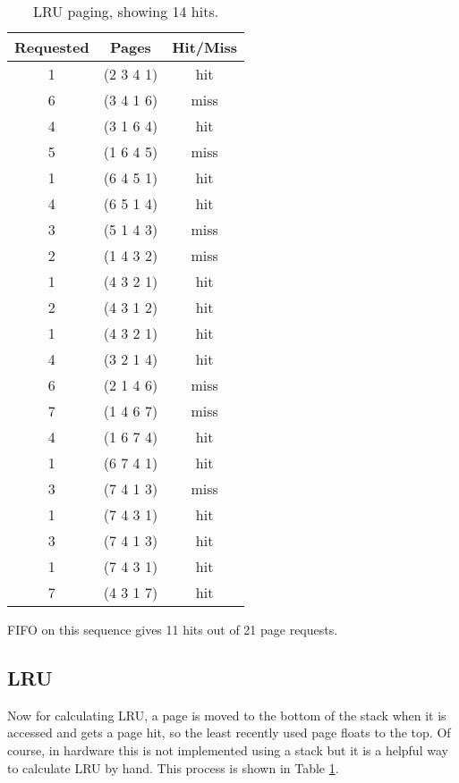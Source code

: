 \documentclass[12pt,letterpaper]{article}
\begin{document}
\begin{table}[!htb]
\begin{subtable}{.5\linewidth}
    \end{subtable}%
    \begin{subtable}{.5\linewidth}
      \centering
        \begin{tabular}{c|c|c}
        Requested & Pages & Hit/Miss\\
        \hline
        1 & (2 3 4 1) & hit\\
        6 & (3 4 1 6) & miss\\
        4 & (3 1 6 4) & hit\\
        5 & (1 6 4 5) & miss\\
        1 & (6 4 5 1) & hit\\
        4 & (6 5 1 4) & hit\\
        3 & (5 1 4 3) & miss\\
        2 & (1 4 3 2) & miss\\
        1 & (4 3 2 1) & hit\\
        2 & (4 3 1 2) & hit\\
        1 & (4 3 2 1) & hit\\
        4 & (3 2 1 4) & hit\\
        6 & (2 1 4 6) & miss\\
        7 & (1 4 6 7) & miss\\
        4 & (1 6 7 4) & hit\\
        1 & (6 7 4 1) & hit\\
        3 & (7 4 1 3) & miss\\
        1 & (7 4 3 1) & hit\\
        3 & (7 4 1 3) & hit\\
        1 & (7 4 3 1) & hit\\
        7 & (4 3 1 7) & hit
        \end{tabular}
        \caption{LRU paging, showing 14 hits.}
        \label{table:lrupage}

    \end{subtable} 
\end{table}

FIFO on this sequence gives 11 hits out of 21 page requests.

\subsection*{LRU}

Now for calculating LRU, a page is moved to the bottom of the stack when it is accessed and gets a
page hit, so the least recently used page floats to the top. Of course, in hardware this is not
implemented using a stack but it is a helpful way to calculate LRU by hand. This process is shown in
Table \ref{table:lrupage}.
\end{document}
